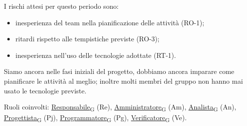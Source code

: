 I rischi attesi per questo periodo sono:
\begin{itemize}
	\item inesperienza del team nella pianificazione delle attività (RO-1);
	\item ritardi rispetto alle tempistiche previste (RO-3);
	\item inesperienza nell'uso delle tecnologie adottate (RT-1).
\end{itemize}
Siamo ancora nelle fasi iniziali del progetto, dobbiamo ancora imparare come pianificare le attività al meglio; inoltre molti membri del gruppo non hanno mai usato le tecnologie previste.

Ruoli coinvolti: \href{https://7last.github.io/docs/rtb/documentazione-interna/glossario\#responsabile}{Responsabile\textsubscript{G}} (Re), \href{https://7last.github.io/docs/rtb/documentazione-interna/glossario\#amministratore}{Amministratore\textsubscript{G}} (Am), \href{https://7last.github.io/docs/rtb/documentazione-interna/glossario\#analista}{Analista\textsubscript{G}} (An), \href{https://7last.github.io/docs/rtb/documentazione-interna/glossario\#progettista}{Progettista\textsubscript{G}} (Pj), \href{https://7last.github.io/docs/rtb/documentazione-interna/glossario\#programmatore}{Programmatore\textsubscript{G}} (Pg), \href{https://7last.github.io/docs/rtb/documentazione-interna/glossario\#verificatore}{Verificatore\textsubscript{G}} (Ve).
